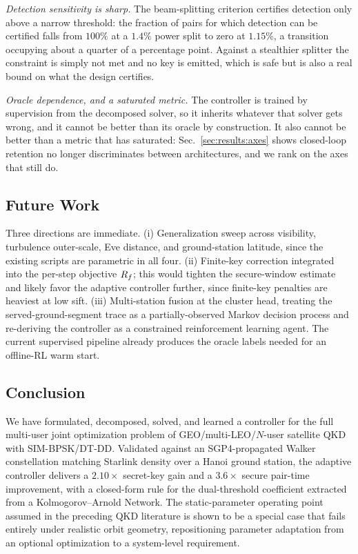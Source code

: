\emph{Detection sensitivity is sharp.} The beam-splitting criterion certifies detection only above a narrow threshold: the fraction of pairs for which detection can be certified falls from $100\%$ at a $1.4\%$ power split to zero at $1.15\%$, a transition occupying about a quarter of a percentage point. Against a stealthier splitter the constraint is simply not met and no key is emitted, which is safe but is also a real bound on what the design certifies.

\emph{Oracle dependence, and a saturated metric.} The controller is trained by supervision from the decomposed solver, so it inherits whatever that solver gets wrong, and it cannot be better than its oracle by construction. It also cannot be better than a metric that has saturated: Sec.~\ref{sec:results:axes} shows closed-loop retention no longer discriminates between architectures, and we rank on the axes that still do.

\subsection{Future Work}\label{sec:conclusion:future}

Three directions are immediate. (i) Generalization sweep across visibility, turbulence outer-scale, Eve distance, and ground-station latitude, since the existing scripts are parametric in all four. (ii) Finite-key correction integrated into the per-step objective $R_f$; this would tighten the secure-window estimate and likely favor the adaptive controller further, since finite-key penalties are heaviest at low sift. (iii) Multi-station fusion at the cluster head, treating the served-ground-segment trace as a partially-observed Markov decision process and re-deriving the controller as a constrained reinforcement learning agent. The current supervised pipeline already produces the oracle labels needed for an offline-RL warm start.

\subsection{Conclusion}

We have formulated, decomposed, solved, and learned a controller for the full multi-user joint optimization problem of GEO/multi-LEO/$N$-user satellite QKD with SIM-BPSK/DT-DD. Validated against an SGP4-propagated Walker constellation matching Starlink density over a Hanoi ground station, the adaptive controller delivers a $2.10\times$ secret-key gain and a $3.6\times$ secure pair-time improvement, with a closed-form rule for the dual-threshold coefficient extracted from a Kolmogorov--Arnold Network. The static-parameter operating point assumed in the preceding QKD literature is shown to be a special case that fails entirely under realistic orbit geometry, repositioning parameter adaptation from an optional optimization to a system-level requirement.
